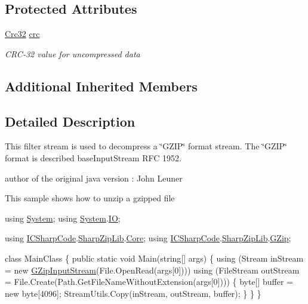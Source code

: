 \subsection*{Protected Attributes}
\begin{DoxyCompactItemize}
\item 
\hyperlink{class_i_c_sharp_code_1_1_sharp_zip_lib_1_1_checksums_1_1_crc32}{Crc32} \hyperlink{class_i_c_sharp_code_1_1_sharp_zip_lib_1_1_g_zip_1_1_g_zip_input_stream_a5547587a7fa539c60eaa8282ecf53f90}{crc}
\begin{DoxyCompactList}\small\item\em C\+R\+C-\/32 value for uncompressed data \end{DoxyCompactList}\end{DoxyCompactItemize}
\subsection*{Additional Inherited Members}


\subsection{Detailed Description}
This filter stream is used to decompress a \char`\"{}\+G\+Z\+I\+P\char`\"{} format stream. The \char`\"{}\+G\+Z\+I\+P\char`\"{} format is described base\+Input\+Stream R\+FC 1952. 

author of the original java version \+: John Leuner 

This sample shows how to unzip a gzipped file 
\begin{DoxyCode}
\textcolor{keyword}{using} \hyperlink{namespace_system}{System};
\textcolor{keyword}{using} \hyperlink{namespace_system}{System}.\hyperlink{namespace_system_1_1_i_o}{IO};

\textcolor{keyword}{using} \hyperlink{namespace_i_c_sharp_code}{ICSharpCode}.\hyperlink{namespace_i_c_sharp_code_1_1_sharp_zip_lib}{SharpZipLib}.\hyperlink{namespace_i_c_sharp_code_1_1_sharp_zip_lib_1_1_core}{Core};
\textcolor{keyword}{using} \hyperlink{namespace_i_c_sharp_code}{ICSharpCode}.\hyperlink{namespace_i_c_sharp_code_1_1_sharp_zip_lib}{SharpZipLib}.\hyperlink{namespace_i_c_sharp_code_1_1_sharp_zip_lib_1_1_g_zip}{GZip};

\textcolor{keyword}{class }MainClass
\{
    \textcolor{keyword}{public} \textcolor{keyword}{static} \textcolor{keywordtype}{void} Main(\textcolor{keywordtype}{string}[] args)
    \{
        \textcolor{keyword}{using} (Stream inStream = \textcolor{keyword}{new} \hyperlink{class_i_c_sharp_code_1_1_sharp_zip_lib_1_1_g_zip_1_1_g_zip_input_stream_a1b9e192df6366d0e8c5328037634393c}{GZipInputStream}(File.OpenRead(args[0])))
        \textcolor{keyword}{using} (FileStream outStream = File.Create(Path.GetFileNameWithoutExtension(args[0]))) \{
            byte[] buffer = \textcolor{keyword}{new} byte[4096];
            StreamUtils.Copy(inStream, outStream, buffer);
        \}
    \}
\}   
\end{DoxyCode}
 

